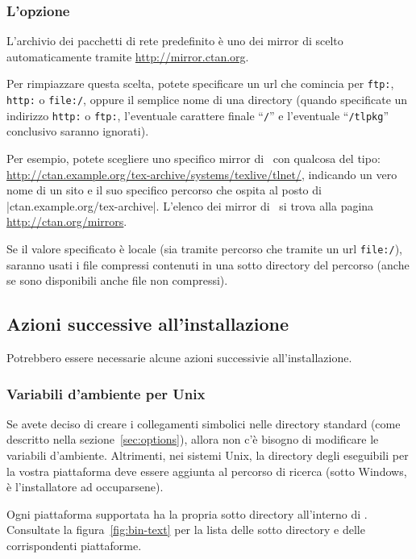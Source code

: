 \documentclass{article}
\begin{document}
\subsubsection{L'opzione }
\label{sec:location}

L'archivio dei pacchetti di rete predefinito è uno dei mirror di \CTAN{}
scelto automaticamente tramite \url{http://mirror.ctan.org}.

Per rimpiazzare questa scelta, potete specificare un url che comincia per
\texttt{ftp:}, \texttt{http:} o \texttt{file:/}, oppure il semplice nome
di una directory (quando specificate un indirizzo \texttt{http:} o
\texttt{ftp:}, l'eventuale carattere finale ``\texttt{/}'' e l'eventuale
``\texttt{/tlpkg}'' conclusivo saranno ignorati).

Per esempio, potete scegliere uno specifico mirror di \CTAN\ con qualcosa
del tipo:
\url{http://ctan.example.org/tex-archive/systems/texlive/tlnet/},
indicando un vero nome di un sito e il suo specifico
percorso che ospita \CTAN al posto di |ctan.example.org/tex-archive|. 
L'elenco dei mirror di \CTAN\ si trova alla
pagina \url{http://ctan.org/mirrors}.
 
Se il valore specificato è locale (sia tramite percorso che tramite un url
\texttt{file:/}), saranno usati i file compressi contenuti in una sotto
directory  del percorso (anche se sono disponibili anche
file non compressi).


\subsection{Azioni successive all'installazione}
\label{sec:postinstall}

Potrebbero essere necessarie alcune azioni successivie all'installazione.

\subsubsection{Variabili d'ambiente per Unix}
\label{sec:env}

Se avete deciso di creare i collegamenti simbolici nelle directory standard
(come descritto nella sezione~\ref{sec:options}), allora non c'è bisogno di
modificare le variabili d'ambiente. Altrimenti, nei sistemi Unix, la
directory degli eseguibili per la vostra piattaforma deve essere aggiunta al
percorso di ricerca (sotto Windows, è l'installatore ad occuparsene).

Ogni piattaforma supportata ha la propria sotto directory all'interno di
. Consultate la figura~\ref{fig:bin-text} per la lista
delle sotto directory e delle corrispondenti piattaforme.
\end{document}
